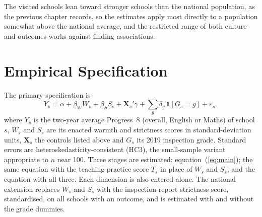 



The visited schools lean toward stronger schools than the national
population, as the previous chapter records, so the estimates apply most
directly to a population somewhat above the national average, and the
restricted range of both culture and outcomes works against finding
associations.

\section{Empirical Specification}
\label{sec:p2_spec}

The primary specification is
%
\begin{equation}
  \label{eq:main}
  Y_s = \alpha + \beta_W W_s + \beta_S S_s + \mathbf{X}_s'\gamma
        + \sum_g \delta_g \,\mathbb{1}[G_s = g] + \varepsilon_s ,
\end{equation}
%
where $Y_s$ is the two-year average Progress~8 (overall, English or Maths) of
school $s$, $W_s$ and $S_s$ are its enacted warmth and strictness scores in
standard-deviation units, $\mathbf{X}_s$ the controls listed above and $G_s$
its 2019 inspection grade. Standard errors are heteroskedasticity-consistent
(HC3), the small-sample variant appropriate to $n$ near 100. Three stages are
estimated: equation~(\ref{eq:main}); the same equation with the
teaching-practice score $T_s$ in place of $W_s$ and $S_s$; and the equation
with all three. Each dimension is also entered alone. The national extension
replaces $W_s$ and $S_s$ with the inspection-report strictness score,
standardised, on all schools with an outcome, and is estimated with and
without the grade dummies.

